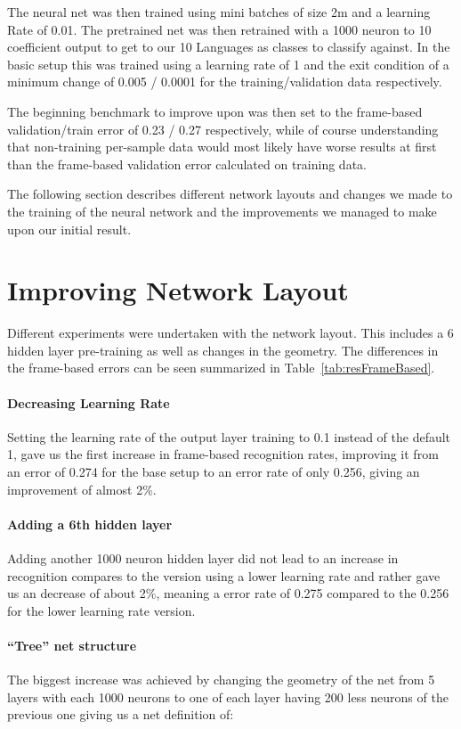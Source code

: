 The neural net was then trained using mini batches of size 2m and a learning Rate of 0.01. The pretrained net was then retrained with a 1000 neuron to 10 coefficient output to get to our 10 Languages as classes to classify against. In the basic setup this was trained using a learning rate of 1 and the exit condition of a minimum change of 0.005 / 0.0001 for the training/validation data respectively.

The beginning benchmark to improve upon was then set to the frame-based validation/train error of 0.23 / 0.27 respectively, while of course understanding that non-training per-sample data would most likely have worse results at first than the frame-based validation error calculated on training data.

The following section describes different network layouts and changes we made to the training of the neural network and the improvements we managed to make upon our initial result.

\section{Improving Network Layout}
\label{sec:LIDNetwork:Layout}

Different experiments were undertaken with the network layout. This includes a 6 hidden layer pre-training as well as changes in the geometry. The differences in the frame-based errors can be seen summarized in Table~\ref{tab:resFrameBased}. 

\paragraph{Decreasing Learning Rate} Setting the learning rate of the output layer training to 0.1 instead of the default 1, gave us the first increase in frame-based recognition rates, improving it from an error of 0.274 for the base setup to an error rate of only 0.256, giving an improvement of almost 2\%. 

\paragraph{Adding a 6th hidden layer} Adding another 1000 neuron hidden layer did not lead to an increase in recognition compares to the version using a lower learning rate and rather gave us an decrease of about 2\%, meaning a error rate of 0.275 compared to the 0.256 for the lower learning rate version.

\paragraph{``Tree'' net structure} The biggest increase was achieved by changing the geometry of the net from 5 layers with each 1000 neurons to one of each layer having 200 less neurons of the previous one giving us a net definition of:


